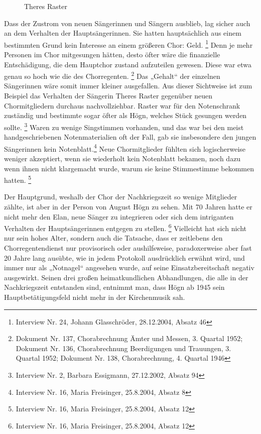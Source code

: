 \begin{figure}
\caption{Theres Raster}
\end{figure}

Dass der Zustrom von neuen Sängerinnen und Sängern ausblieb, lag sicher
auch an dem Verhalten der Hauptsängerinnen. Sie hatten hauptsächlich
aus einem bestimmten Grund kein Interesse an einem größeren Chor:
Geld. \footnote{Interview Nr. 24, Johann Glasschröder, 28.12.2004,
Absatz 46} Denn je mehr Personen im Chor mitgesungen hätten, desto
öfter wäre die finanzielle Entschädigung, die dem Hauptchor zustand
aufzuteilen gewesen. Diese war etwa genau so hoch wie die des
Chorregenten. \footnote{Dokument Nr. 137, Chorabrechnung Ämter und
Messen, 3. Quartal 1952; Dokument Nr. 136, Chorabrechnung Beerdigungen
und Trauungen, 3. Quartal 1952; Dokument Nr. 138, Chorabrechnung, 4.
Quartal 1946} Das „Gehalt“ der einzelnen Sängerinnen wäre somit immer
kleiner ausgefallen. Aus dieser Sichtweise ist zum Beispiel das
Verhalten der Sängerin Theres Raster gegenüber neuen Chormitgliedern
durchaus nachvollziehbar. Raster war für den Notenschrank zuständig und
bestimmte sogar öfter als Högn, welches Stück gesungen werden
sollte. \footnote{Interview Nr. 2, Barbara Essigmann, 27.12.2002,
Absatz 94} Waren zu wenige Singstimmen vorhanden, und das war bei den
meist handgeschriebenen Notenmaterialien oft der Fall, gab sie
insbesondere den jungen Sängerinnen kein Notenblatt.\footnote{
Interview Nr. 16, Maria Freisinger, 25.8.2004, Absatz 8} Neue
Chormitglieder fühlten sich logischerweise weniger akzeptiert, wenn sie
wiederholt kein Notenblatt bekamen, noch dazu wenn ihnen nicht
klargemacht wurde, warum sie keine Stimmestimme bekommen
hatten. \footnote{Interview Nr. 16, Maria Freisinger, 25.8.2004, Absatz
12}

Der Hauptgrund, weshalb der Chor der Nachkriegszeit so wenige Mitglieder
zählte, ist aber in der Person von August Högn zu sehen. Mit 70 Jahren
hatte er nicht mehr den Elan, neue Sänger zu integrieren oder sich dem
intriganten Verhalten der Hauptsängerinnen entgegen zu
stellen. \footnote{Interview Nr. 16, Maria Freisinger, 25.8.2004,
Absatz 12} Vielleicht hat sich nicht nur sein hohes Alter, sondern auch
die Tatsache, dass er zeitlebens den Chorregentendienst nur
provisorisch oder aushilfsweise, paradoxerweise aber fast 20 Jahre lang
ausübte, wie in jedem Protokoll ausdrücklich erwähnt wird, und immer
nur als „Notnagel“ angesehen wurde, auf seine Einsatzbereitschaft
negativ ausgewirkt. Seinen drei großen heimatkundlichen Abhandlungen,
die alle in der Nachkriegszeit entstanden sind, entnimmt man, dass Högn
ab 1945 sein Hauptbetätigungsfeld nicht mehr in der Kirchenmusik sah.

